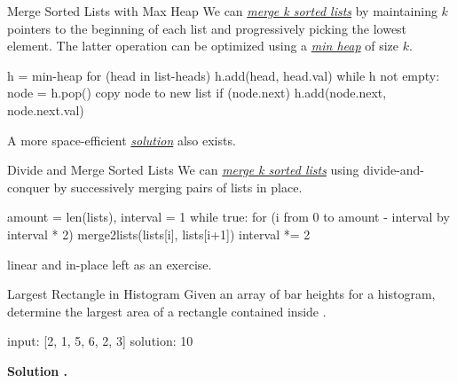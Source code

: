 \documentclass{cognito}
\begin{document}
\begin{note}{Merge Sorted Lists with Max Heap}
	We can \hyperref[note:Merge k Sorted Lists]{\it merge k sorted lists} by maintaining $k$ pointers to the beginning
	of each list and progressively picking the lowest element. The latter operation can be optimized using a \hyperref[note:Heap]{\it min heap}
	of size $k$.
	
	\begin{largecode}
 h = min-heap
 for (head in list-heads) h.add(head, head.val)
 while h not empty:
 	node = h.pop()
	copy node to new list
	if (node.next) h.add(node.next, node.next.val)
	\end{largecode}

	\begin{remark} A more space-efficient \hyperref[note:Divide and Merge Sorted Lists]{\it solution} also exists. \end{remark}\vspace{-5pt}
\end{note}

\begin{note}{Divide and Merge Sorted Lists}
	We can \hyperref[note:Merge k Sorted Lists]{\it merge k sorted lists} using divide-and-conquer by
	successively merging pairs of lists in place.
	
	\begin{largecode}
 amount = len(lists), interval = 1
 while true:
 	for (i from 0 to amount - interval by interval * 2)
		merge2lists(lists[i], lists[i+1])
	interval *= 2
	\end{largecode}
	\begin{remark} linear and in-place  left as an exercise. \end{remark}
	\vspace{-5pt}
\end{note}

\begin{note}{Largest Rectangle in Histogram}
	Given an array  of bar heights for a histogram,
	determine the largest area of a rectangle contained inside .
	
	\begin{largecode}
 input: [2, 1, 5, 6, 2, 3]
 solution: 10
	\end{largecode}
	\bf Solution \hyperref[note:Linear Largest Rectangle]{\solutionref}.
\end{note}
\end{document}

